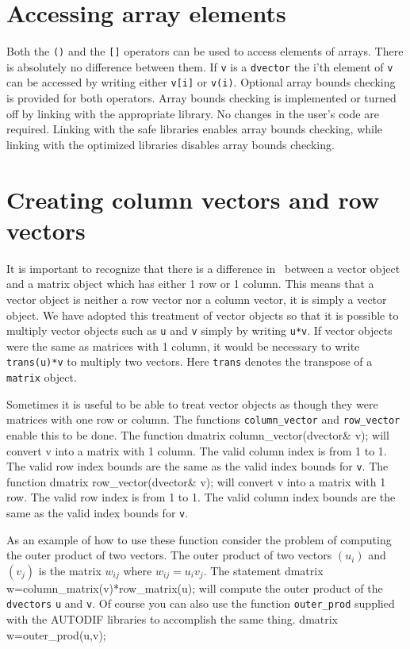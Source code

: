 \documentclass[12pt]{book}
\begin{document}
\section{Accessing array elements}
Both the {\tt ()} and the {\tt []} operators can be used to access elements 
of arrays. There is absolutely no difference between them. 
If {\tt v} is a {\tt dvector} the i'th
element of {\tt v} can be accessed by writing either {\tt v[i]}
or {\tt v(i)}.
Optional array bounds checking is provided for both operators.
Array bounds checking is implemented or turned off
by linking with the appropriate library. No changes in the user's code
are required. Linking with the safe libraries 
enables array 
bounds checking, while linking with the optimized libraries 
disables array bounds checking. 
\section{Creating column vectors and row vectors}
It is important to recognize that there is a difference in \AD\ between
a vector object and a matrix object which has either 1 row or 1 column.
This means that a vector object is neither a row vector nor a column
vector, it is simply a vector object. We have adopted this
treatment of vector objects so that it is possible to
multiply vector objects such as {\tt u} and {\tt v}
simply by writing {\tt u*v}. If vector objects were the
same as matrices with 1 column, it would be necessary to
write {\tt trans(u)*v} to multiply two vectors. Here {\tt trans}
denotes the transpose of a {\tt matrix} object.

Sometimes it is useful to be able to treat vector objects as
though they were matrices with one row or column. The functions
{\tt column\_vector} and {\tt row\_vector} enable this to
be done.  The function
\beginexample
dmatrix column_vector(dvector& v);
\endexample
\noindent will convert v into a matrix  with 1 column. The valid column
index is from 1 to 1. The valid row index bounds are the same 
as the valid index bounds for {\tt v}. The function
\beginexample
dmatrix row_vector(dvector& v);
\endexample
\noindent will convert v into a matrix  with 1 row. The valid row 
index is from 1 to 1. The valid column index bounds are the same 
as the valid index bounds for {\tt v}. 

As an example of how to use these function consider the problem
of computing the outer product of two vectors. The outer product
of two vectors $(u_i)$ and $(v_j)$ is the matrix $w_{ij}$
where $w_{ij}=u_iv_j$.  The statement
\beginexample
dmatrix w=column_matrix(v)*row_matrix(u);
\endexample
\noindent will compute the outer product of the {\tt dvectors}
{\tt u} and {\tt v}. Of course you can also use the
function {\tt outer\_prod} supplied with the AUTODIF libraries
to accomplish the same thing.
\beginexample
dmatrix w=outer_prod(u,v);
\endexample
\end{document}
